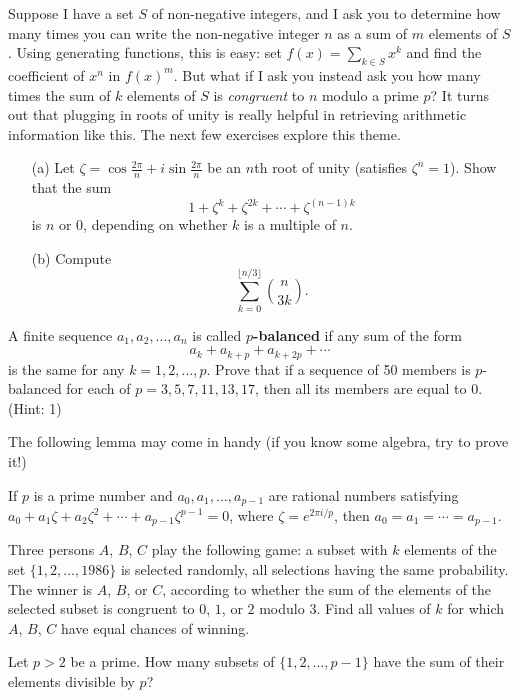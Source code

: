 \documentclass{article}
\begin{document}
Suppose I have a set $S$ of non-negative integers, and I ask you to determine how many times you can write the non-negative integer $n$ as a sum of $m$ elements of $S$. Using generating functions, this is easy: set $f(x)=\sum_{k\in S} x^k$ and find the coefficient of $x^n$ in $f(x)^m$. But what if I ask you instead ask you how many times the sum of $k$ elements of $S$ is \emph{congruent} to $n$ modulo a prime $p$? It turns out that plugging in roots of unity is really helpful in retrieving arithmetic information like this. The next few exercises explore this theme. 

\begin{exercise}
\begin{enumerate}
    \item[(a)] Let \(\zeta=\cos\frac{2\pi}{n} + i\sin\frac{2\pi}{n}\) be an \(n\)th root of unity (satisfies \(\zeta^n=1\)).
    Show that the sum
    \[1 + \zeta^k + \zeta^{2k} + \cdots + \zeta^{(n-1)k}\]
    is \(n\) or 0, depending on whether \(k\) is a multiple of \(n\).
    \item[(b)] Compute
    \[\sum_{k=0}^{\lfloor n/3\rfloor}\binom{n}{3k}.\]
\end{enumerate}
\end{exercise}

\begin{exercise}
A finite sequence \(a_1,a_2,\ldots,a_n\) is called \textbf{\(p\)-balanced} if any sum of the form
\[a_k + a_{k+p} + a_{k+2p} + \cdots\]
is the same for any \(k=1,2,\ldots,p\).
Prove that if a sequence of 50 members is \(p\)-balanced for each of \(p=3,5,7,11,13,17\), then all its members are equal to 0. (Hint: 1)
\end{exercise}
The following lemma may come in handy (if you know some algebra, try to prove it!)
\begin{lemma}
If $p$ is a prime number and $a_0,a_1,\dots,a_{p-1}$ are rational numbers satisfying $a_0+a_1\zeta+a_2\zeta^2+\cdots+a_{p-1}\zeta^{p-1}=0$, where $\zeta=e^{2\pi i /p}$, then $a_0=a_1=\cdots=a_{p-1}$. 
\end{lemma}

\begin{exercise}
Three persons $A$, $B$, $C$ play the following game: a subset with $k$ elements of the set $\{1,2,\dots,1986\}$ is selected randomly, all selections having the same probability. The winner is $A$, $B$, or $C$, according to whether the sum of the elements of the selected subset is congruent to $0$, $1$, or $2$ modulo $3$. Find all values of $k$ for which $A$, $B$, $C$ have equal chances of winning.
\end{exercise}
\begin{exercise}
Let $p>2$ be a prime. How many subsets of $\{1,2,\dots,p-1\}$ have the sum of their elements divisible by $p$?
\end{exercise}
\end{document}
